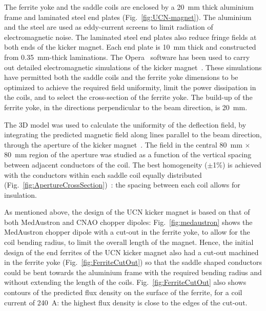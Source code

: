 \documentclass[aps,prab,twocolumn,superscriptaddress]{revtex4-1}
\begin{document}
The ferrite yoke and the saddle coils are enclosed by a 20~mm thick aluminium frame and laminated steel end plates (Fig.~\ref{fig:UCN-magnet}). The aluminium and the steel are used as eddy-current screens to limit radiation of electromagnetic noise. The laminated steel end plates also reduce fringe fields at both ends of the kicker magnet. Each end plate is 10~mm thick and constructed from 0.35~mm-thick laminations. The Opera~\cite{cobham} software has been used to carry out detailed electromagnetic simulations of the kicker magnet~\cite{Hahn}. These simulations have permitted both the saddle coils and the ferrite yoke dimensions to be optimized to achieve the required field uniformity, limit the power dissipation in the coils, and to select the cross-section of the ferrite yoke. The build-up of the ferrite yoke, in the directions perpendicular to the beam direction, is 20~mm.

The 3D model was used to calculate the uniformity of the deflection field, by integrating the predicted magnetic field along lines parallel to the beam direction, through the aperture of the kicker magnet~\cite{Hahn}. The field in the central 80~mm $\times$ 80~mm region of the aperture was studied as a function of the vertical spacing between adjacent conductors of the coil. The best homogeneity ($\pm$1\%) is achieved with the conductors within each saddle coil equally distributed  (Fig.~\ref{fig:ApertureCrossSection})~\cite{Hahn}: the spacing between each coil allows for insulation. 

As mentioned above, the design of the UCN kicker magnet is based on that of both MedAustron and CNAO chopper dipoles: Fig.~\ref{fig:medaustron} shows the MedAustron chopper dipole with a cut-out in the ferrite yoke, to allow for the coil bending radius, to limit the overall length of the magnet. Hence, the initial design of the end ferrites of the UCN kicker magnet also had a cut-out machined in the ferrite yoke (Fig.~\ref{fig:FerriteCutOut}) so that the saddle shaped conductors could be bent towards the aluminium frame with the required bending radius and without extending the length of the coils. Fig.~\ref{fig:FerriteCutOut} also shows contours of the predicted flux density on the surface of the ferrite, for a coil current of 240~A: the highest flux density is close to the edges of the cut-out. 
\end{document}

